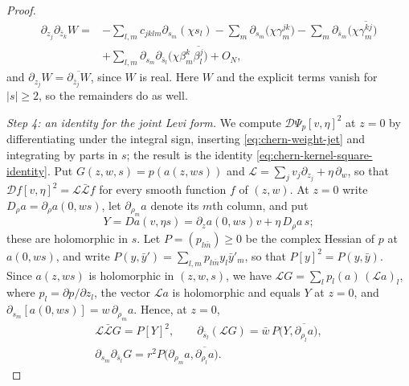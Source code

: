 \begin{proof}
\begin{equation}
\begin{aligned}
 \partial_{z_j}\partial_{\bar z_k}W={}&-\sum_{l,m}c_{jklm}\partial_{s_m}(\chi s_l)-\sum_m\partial_{s_m}\bigl(\chi\gamma^{jk}_m\bigr)-\sum_m\partial_{\bar s_m}\bigl(\chi\overline{\gamma^{kj}_m}\bigr)\\
 &+\sum_{l,m}\partial_{s_m}\partial_{\bar s_l}\bigl(\chi\beta^k_m\overline{\beta^j_l}\bigr)+O_N,
\end{aligned}
\end{equation}
and $\partial_{z_j}W=\overline{\partial_{\bar z_j}W}$, since $W$ is real. Here $W$ and the explicit terms vanish for $|s|\geq2$, so the remainders do as well.

\emph{Step 4: an identity for the joint Levi form.} We compute $\mathcal D\Psi_p[v,\eta]^2$ at $z=0$ by differentiating under the integral sign, inserting \eqref{eq:chern-weight-jet} and integrating by parts in $s$; the result is the identity \eqref{eq:chern-kernel-square-identity}. Put $G(z,w,s)=p(a(z,ws))$ and $\mathcal L=\sum_jv_j\partial_{z_j}+\eta\,\partial_w$, so that $\mathcal Df[v,\eta]^2=\mathcal L\bar{\mathcal L}f$ for every smooth function $f$ of $(z,w)$. At $z=0$ write $D_\rho a=\partial_\rho a(0,ws)$, let $\partial_{\rho_m}a$ denote its $m$th column, and put
\[
 Y=Da(v,\eta s)=\partial_za(0,ws)v+\eta\,D_\rho a\,s;
\]
these are holomorphic in $s$. Let $P=(p_{l\bar m})\geq0$ be the complex Hessian of $p$ at $a(0,ws)$, and write $P(y,\bar y')=\sum_{l,m}p_{l\bar m}y_l\bar y'_m$, so that $P[y]^2=P(y,\bar y)$. Since $a(z,ws)$ is holomorphic in $(z,w,s)$, we have $\mathcal LG=\sum_lp_l(a)\,(\mathcal La)_l$, where $p_l=\partial p/\partial z_l$, the vector $\mathcal La$ is holomorphic and equals $Y$ at $z=0$, and $\partial_{s_m}[a(0,ws)]=w\,\partial_{\rho_m}a$. Hence, at $z=0$,
\begin{equation}\label{eq:chern-integrand-derivatives}
\begin{gathered}
 \mathcal L\bar{\mathcal L}G=P[Y]^2,\qquad \partial_{\bar s_l}(\mathcal LG)=\bar w\,P\bigl(Y,\overline{\partial_{\rho_l}a}\bigr),\\
 \partial_{s_m}\partial_{\bar s_l}G=r^2P\bigl(\partial_{\rho_m}a,\overline{\partial_{\rho_l}a}\bigr).
\end{gathered}
\end{equation}


\end{proof}
